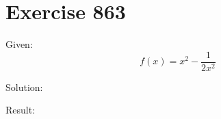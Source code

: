 \documentclass[a4paper, 10pt]{scrartcl}
\begin{document}
\section{Exercise 863}

Given:
\[
f(x) = x^{2} - \frac{1}{2x^{2}}
\]

Solution:

Result:
\end{document}
